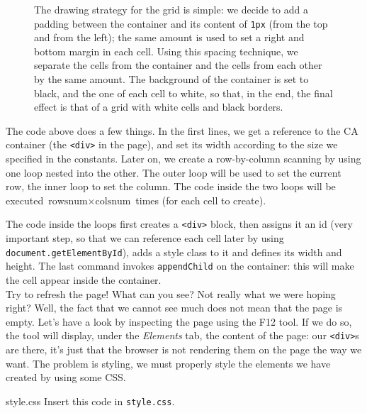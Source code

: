 %
\begin{figure}[b]
\sidecaption

%
%
\caption{The drawing strategy for the grid
is simple: we decide to add a padding between the container
and its content of \texttt{1px} (from the top and from the left);
the same amount is used to set a right and bottom margin in each cell. Using this spacing
technique, we separate the cells from the container and the cells from each other by the same
amount. The background of the container is set to black, and the one of each cell to white, so
that, in the end, the final effect is that of a grid with white cells and black borders.}
\label{fig:gridlayout}
\end{figure}
%

The code above does a few things. In the first lines, we get a reference to the CA container
(the \texttt{<div>} in the page), and set its width according to the size we specified in the
constants. Later on, we create a row-by-column scanning by using one loop nested into the other.
The outer loop will be used to set the current row, the inner loop to set the column. The code
inside the two loops will be executed $\text{rowsnum} \times \text{colsnum}$ times
(for each cell to create).

The code inside the loops first creates a \texttt{<div>} block, then assigns it an id (very
important step, so that we can reference each cell later
by using \texttt{document.getElementById}), adds a style class to it and defines its width and height.
The last command invokes \texttt{appendChild} on the container: this will make the cell appear
inside the container.\\

Try to refresh the page! What can you see? Not really what we were hoping right? Well, the fact that
we cannot see much does not mean that the page is empty. Let's have a look by inspecting the page
using the F12 tool. If we do so, the tool will display, under the \textit{Elements} tab, the
content of the page: our \texttt{<div>}s are there, it's just that the browser is not rendering
them on the page the way we want. The problem is styling, we must properly style the elements we
have created by using some CSS.

\begin{programcode}{style.css}
Insert this code in \texttt{style.css}.
\end{programcode}

